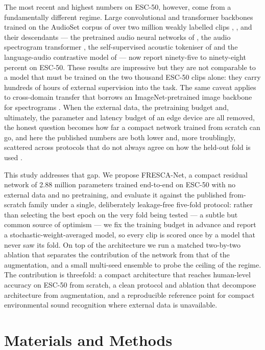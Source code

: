 \documentclass[conference]{IEEEtran}
\begin{document}
The most recent and highest numbers on ESC-50, however, come from a fundamentally different regime. Large convolutional and transformer backbones trained on the AudioSet corpus of over two million weakly labelled clips \cite{hershey_cnnaudio}, \cite{gemmeke_audioset}, and their descendants --- the pretrained audio neural networks of \cite{kong_panns}, the audio spectrogram transformer \cite{gong_ast}, the self-supervised acoustic tokeniser of \cite{chen_beats} and the language-audio contrastive model of \cite{elizalde_clap} --- now report ninety-five to ninety-eight percent on ESC-50. These results are impressive but they are not comparable to a model that must be trained on the two thousand ESC-50 clips alone: they carry hundreds of hours of external supervision into the task. The same caveat applies to cross-domain transfer that borrows an ImageNet-pretrained image backbone for spectrograms \cite{guzhov_esresnet}. When the external data, the pretraining budget and, ultimately, the parameter and latency budget of an edge device are all removed, the honest question becomes how far a compact network trained from scratch can go, and here the published numbers are both lower and, more troublingly, scattered across protocols that do not always agree on how the held-out fold is used \cite{palanisamy_rethinking}.

This study addresses that gap. We propose FRESCA-Net, a compact residual network of 2.88 million parameters trained end-to-end on ESC-50 with no external data and no pretraining, and evaluate it against the published from-scratch family under a single, deliberately leakage-free five-fold protocol: rather than selecting the best epoch on the very fold being tested --- a subtle but common source of optimism --- we fix the training budget in advance and report a stochastic-weight-averaged model, so every clip is scored once by a model that never saw its fold. On top of the architecture we run a matched two-by-two ablation that separates the contribution of the network from that of the augmentation, and a small multi-seed ensemble to probe the ceiling of the regime. The contribution is threefold: a compact architecture that reaches human-level accuracy on ESC-50 from scratch, a clean protocol and ablation that decompose architecture from augmentation, and a reproducible reference point for compact environmental sound recognition where external data is unavailable.

\section{Materials and Methods}
\end{document}
